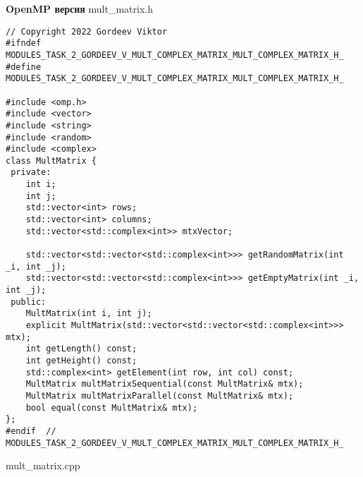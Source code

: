 \documentclass{report}
\begin{document}
\textbf{OpenMP версия}
\newline
\newline mult_matrix.h
\begin{lstlisting}
// Copyright 2022 Gordeev Viktor
#ifndef MODULES_TASK_2_GORDEEV_V_MULT_COMPLEX_MATRIX_MULT_COMPLEX_MATRIX_H_
#define MODULES_TASK_2_GORDEEV_V_MULT_COMPLEX_MATRIX_MULT_COMPLEX_MATRIX_H_

#include <omp.h>
#include <vector>
#include <string>
#include <random>
#include <complex>
class MultMatrix {
 private:
    int i;
    int j;
    std::vector<int> rows;
    std::vector<int> columns;
    std::vector<std::complex<int>> mtxVector;

    std::vector<std::vector<std::complex<int>>> getRandomMatrix(int _i, int _j);
    std::vector<std::vector<std::complex<int>>> getEmptyMatrix(int _i, int _j);
 public:
    MultMatrix(int i, int j);
    explicit MultMatrix(std::vector<std::vector<std::complex<int>>> mtx);
    int getLength() const;
    int getHeight() const;
    std::complex<int> getElement(int row, int col) const;
    MultMatrix multMatrixSequential(const MultMatrix& mtx);
    MultMatrix multMatrixParallel(const MultMatrix& mtx);
    bool equal(const MultMatrix& mtx);
};
#endif  // MODULES_TASK_2_GORDEEV_V_MULT_COMPLEX_MATRIX_MULT_COMPLEX_MATRIX_H_

\end{lstlisting}
mult_matrix.cpp
\end{document}
